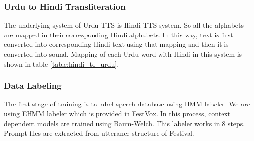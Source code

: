 \begin{itemize}
\subsubsection{Urdu to Hindi Transliteration}

The underlying system of Urdu TTS is Hindi TTS system. So all the alphabets are mapped in their corresponding Hindi alphabets. 
In this way, text is first converted into corresponding Hindi text using that mapping and then it is converted into sound. 
Mapping of each Urdu word with Hindi in this system is shown in table \ref{table:hindi_to_urdu}.

\subsubsection{Data Labeling}

The first stage of training is to label speech database using HMM labeler. We are using EHMM labeler which is provided in FestVox. In this process, context dependent models are trained using Baum-Welch. This labeler works in 8 steps.
Prompt files are extracted from utterance structure of Festival.

\end{itemize}
